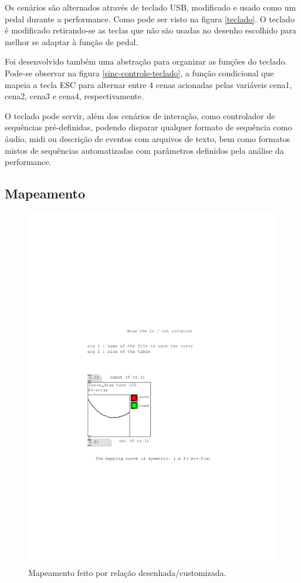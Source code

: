 \documentclass{ppgmus}
\begin{document}
Os cenários são alternados através de teclado USB, modificado e usado como
um pedal durante a performance. Como pode ser visto na figura \ref{teclado}.
O teclado é modificado retirando-se as teclas que não são usadas no desenho escolhido
para melhor se adaptar à função de pedal.

Foi desenvolvido também uma abstração para organizar as funções do teclado.
Pode-se observar na figura \ref{sinc-controle-teclado}, a função condicional
que mapeia a tecla ESC para alternar entre 4 cenas acionadas pelas variáveis
cena1, cena2, cena3 e cena4, respectivamente.

O teclado pode servir, além dos cenários de interação, como controlador
de sequências pré-definidas, podendo disparar qualquer formato de sequência como
áudio, midi ou descrição de eventos com arquivos de texto, bem como formatos mistos
de sequências automatizadas com parâmetros definidos pela análise da performance.


\subsection{Mapeamento}


\begin{figure}
\includegraphics[scale=.6]{mapping1}
\caption{Mapeamento feito por relação desenhada/customizada.}
\label{mapping1}
\end{figure}
\end{document}
